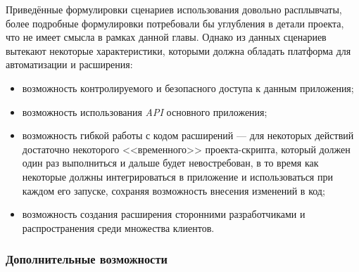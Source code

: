 Приведённые формулировки сценариев использования довольно расплывчаты, более подробные формулировки потребовали бы углубления в детали проекта, что не имеет смысла в рамках данной главы. Однако из данных сценариев вытекают некоторые характеристики, которыми должна обладать платформа для автоматизации и расширения:
\begin{itemize}
 \item возможность контролируемого и безопасного доступа к данным приложения;
 \item возможность использования {\it API} основного приложения;
 \item возможность гибкой работы с кодом расширений --- для некоторых действий достаточно некоторого <<временного>> проекта-скрипта, который должен один раз выполниться и дальше будет невостребован, в то время как некоторые должны интегрироваться в приложение и использоваться при каждом его запуске, сохраняя возможность внесения изменений в код;
 \item возможность создания расширения сторонними разработчиками и распространения среди множества клиентов.
\end{itemize}

\subsubsection{Дополнительные возможности}

\pagebreak
